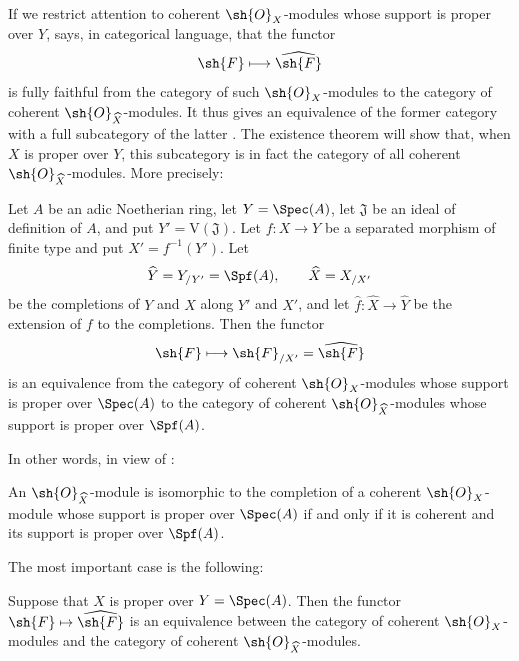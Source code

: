 If we restrict attention to coherent $\sh{O}_X$-modules whose
support is proper over $Y$,  says, in categorical
language, that the functor
\[
  \sh{F}\longmapsto\widehat{\sh{F}}
\]
is fully faithful from the category of such $\sh{O}_X$-modules to
the category of coherent $\sh{O}_{\widehat{X}}$-modules.  It thus
gives an equivalence of the former category with a full
subcategory of the latter .  The existence theorem
will show that, when $X$ is proper over $Y$, this subcategory is in
fact the category of all coherent
$\sh{O}_{\widehat{X}}$-modules.  More precisely:

\begin{theorem}[5.1.4]
\label{III.5.1.4}
Let $A$ be an adic Noetherian ring, let $Y=\Spec(A)$, let
$\mathfrak{J}$ be an ideal of definition of $A$, and put
$Y'=\mathrm{V}(\mathfrak{J})$.  Let $f:X\to Y$ be a separated
morphism of finite type and put $X'=f^{-1}(Y')$.  Let
\[
  \widehat{Y}=Y_{/Y'}=\Spf(A),\qquad
  \widehat{X}=X_{/X'}
\]
be the completions of $Y$ and $X$ along $Y'$ and $X'$, and let
$\widehat{f}:\widehat{X}\to\widehat{Y}$ be the extension of $f$ to
the completions.  Then the functor
\[
  \sh{F}\longmapsto\sh{F}_{/X'}=\widehat{\sh{F}}
\]
is an equivalence from the category of coherent
$\sh{O}_X$-modules whose support is proper over $\Spec(A)$ to the
category of coherent $\sh{O}_{\widehat{X}}$-modules whose support
is proper over $\Spf(A)$.
\end{theorem}

In other words, in view of :

\begin{corollary}[5.1.5]
\label{III.5.1.5}
An $\sh{O}_{\widehat{X}}$-module is isomorphic to the completion of
a coherent $\sh{O}_X$-module whose support is proper over
$\Spec(A)$ if and only if it is coherent and its support is proper
over $\Spf(A)$.
\end{corollary}

The most important case is the following:

\begin{corollary}[5.1.6]
\label{III.5.1.6}
Suppose that $X$ is proper over $Y=\Spec(A)$.  Then the functor
$\sh{F}\mapsto\widehat{\sh{F}}$ is an equivalence between the
category of coherent $\sh{O}_X$-modules and the category of
coherent $\sh{O}_{\widehat{X}}$-modules.
\end{corollary}

